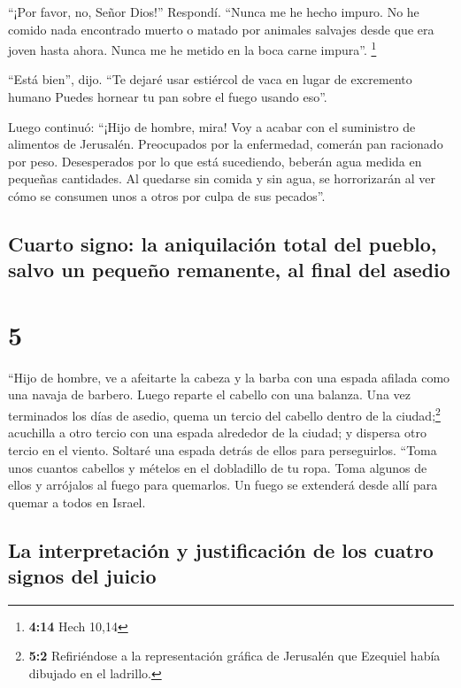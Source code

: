  ``¡Por favor, no, Señor Dios!'' Respondí. ``Nunca me he
hecho impuro. No he comido nada encontrado muerto o matado por animales
salvajes desde que era joven hasta ahora. Nunca me he metido en la boca
carne impura''. \footnote{\textbf{4:14} Hech 10,14}

 ``Está bien'', dijo. ``Te dejaré usar estiércol de vaca
en lugar de excremento humano Puedes hornear tu pan sobre el fuego
usando eso''.

 Luego continuó: ``¡Hijo de hombre, mira! Voy a acabar
con el suministro de alimentos de Jerusalén. Preocupados por la
enfermedad, comerán pan racionado por peso. Desesperados por lo que está
sucediendo, beberán agua medida en pequeñas cantidades. 
Al quedarse sin comida y sin agua, se horrorizarán al ver cómo se
consumen unos a otros por culpa de sus pecados''.

\hypertarget{cuarto-signo-la-aniquilaciuxf3n-total-del-pueblo-salvo-un-pequeuxf1o-remanente-al-final-del-asedio}{%
\subsection{Cuarto signo: la aniquilación total del pueblo, salvo un
pequeño remanente, al final del
asedio}\label{cuarto-signo-la-aniquilaciuxf3n-total-del-pueblo-salvo-un-pequeuxf1o-remanente-al-final-del-asedio}}

\hypertarget{section-4}{%
\section{5}\label{section-4}}

 ``Hijo de hombre, ve a afeitarte la cabeza y la barba con
una espada afilada como una navaja de barbero. Luego reparte el cabello
con una balanza.  Una vez terminados los días de asedio,
quema un tercio del cabello dentro de la ciudad;\footnote{\textbf{5:2}
  Refiriéndose a la representación gráfica de Jerusalén que Ezequiel
  había dibujado en el ladrillo.} acuchilla a otro tercio con una espada
alrededor de la ciudad; y dispersa otro tercio en el viento. Soltaré una
espada detrás de ellos para perseguirlos.  ``Toma unos
cuantos cabellos y mételos en el dobladillo de tu ropa. 
Toma algunos de ellos y arrójalos al fuego para quemarlos. Un fuego se
extenderá desde allí para quemar a todos en Israel.

\hypertarget{la-interpretaciuxf3n-y-justificaciuxf3n-de-los-cuatro-signos-del-juicio}{%
\subsection{La interpretación y justificación de los cuatro signos del
juicio}\label{la-interpretaciuxf3n-y-justificaciuxf3n-de-los-cuatro-signos-del-juicio}}

